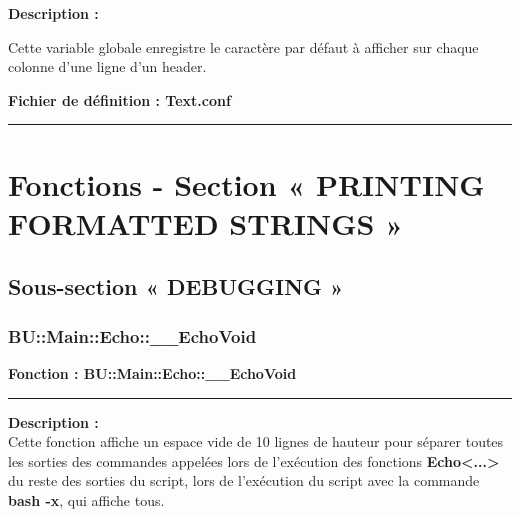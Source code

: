 \documentclass[a4paper,10pt]{article}
\begin{document}
\setlength{\parskip}{2em}

\begin{justify}
    \textbf{Description :}
\end{justify}

\setlength{\parskip}{1em}

\begin{justify}
    Cette variable globale enregistre le caractère par défaut à afficher sur chaque colonne d'une ligne d'un header.
\end{justify}

\textbf{Fichier de définition : \color{path}Text.conf}\\[1\baselineskip]





\color{sec1}\par\noindent\rule{\textwidth}{0.4pt}\color{text}

\color{sec1}
\section{Fonctions - Section « PRINTING FORMATTED STRINGS »}\color{text}

\color{sec2}
\subsection{Sous-section « DEBUGGING »}\color{text}

\color{sec3}
\subsubsection{BU::Main::Echo::\_\_EchoVoid}\color{text}

\textbf{Fonction : \color{func}BU::Main::Echo::\_\_EchoVoid}\setlength{\parskip}{1em}


\par\noindent\rule{\textwidth}{0.4pt}

\begin{justify}
    \textbf{Description :}\\[1\baselineskip]
    Cette fonction affiche un espace vide de 10 lignes de hauteur pour séparer toutes les sorties des commandes appelées lors de l'exécution des fonctions \textbf{\color{func}Echo<...>} du reste des sorties du script, lors de l'exécution du script avec la commande \textbf{\color{cmds}bash -x}, qui affiche tous.
\end{justify}
\end{document}
